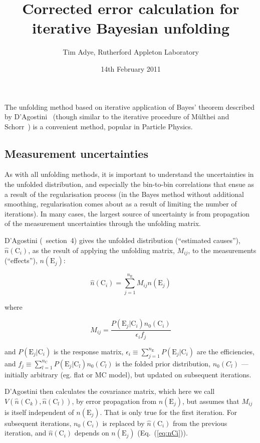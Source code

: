 \documentclass[12pt,a4paper]{article}
\newcommand{\E}{\mathrm{E}}
\newcommand{\C}{\mathrm{C}}
\begin{document}
\title{Corrected error calculation for iterative Bayesian unfolding}
\author{Tim Adye, Rutherford Appleton Laboratory}
\date{14th February 2011}
\maketitle

The unfolding method based on iterative application of Bayes' theorem
described by D'Agostini~\cite{D'Agostini:1994zf}
(though similar to the iterative procedure of
M\"ulthei and Schorr~\cite{Multhei:1986ps})
is a convenient method, popular in Particle Physics.

\subsection{Measurement uncertainties}

As with all unfolding methods, it is important to understand
the uncertainties in the unfolded distribution, and especially the bin-to-bin correlations
that ensue as a result of the regularisation process (in the Bayes method without additional smoothing, regularisation
comes about as a result of limiting the number of iterations).
In many cases, the largest source of uncertainty is from propagation of the measurement
uncertainties through the unfolding matrix.

D'Agostini (\cite{D'Agostini:1994zf}~section~4) gives the unfolded distribution (``estimated causes''), $\hat{n}(\C_i)$,
as the result of applying the unfolding matrix, $M_{ij}$, to the measurements (``effects''), $n(\E_j)$:

\begin{equation}
\hat{n}(\C_i) = \sum_{j=1}^{n_{\E}} M_{ij} n(\E_j)
\label{eq:nCi}
\end{equation}

\noindent where

\begin{equation}
M_{ij} = \frac{P(\E_j|\C_i) n_0(\C_i)}{\epsilon_i f_j}
\end{equation}

\noindent and
$P(\E_j|\C_i)$ is the response matrix,
$\epsilon_i \equiv \sum_{j=1}^{n_{\E}} P(\E_j|\C_i)$ are the efficiencies, and
$f_j \equiv \sum_{l=1}^{n_{\C}} P(\E_j|\C_l) n_0(C_l)$ is the folded
prior distribution, $n_0(C_l)$ --- initially arbitrary (eg. flat or MC model), but updated on
subsequent iterations.

D'Agostini then calculates the covariance matrix, which here we call $V(\hat{n}(\C_k),\hat{n}(\C_l))$,
by error propagation from $n(\E_j)$,
but assumes that $M_{ij}$ is itself independent of $n(\E_j)$. That is only true for the first iteration.
For subsequent iterations, $n_0(\C_i)$ is replaced by $\hat{n}(\C_i)$ from the
previous iteration, and $\hat{n}(\C_i)$ depends on $n(\E_j)$ (Eq.~(\ref{eq:nCi})).
\end{document}

